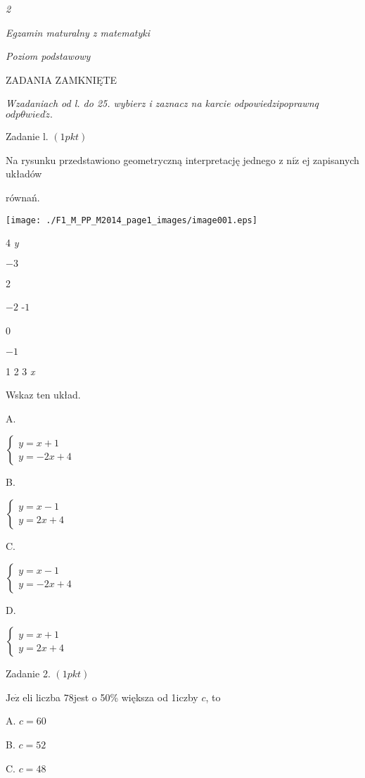 \documentclass[a4paper,12pt]{article}
\begin{document}
{\it 2}

{\it Egzamin maturalny z matematyki}

{\it Poziom podstawowy}

ZADANIA ZAMKNIĘTE

{\it Wzadaniach od l. do 25. wybierz i zaznacz na karcie odpowiedzipoprawnq} $odp\theta wied\acute{z}.$

Zadanie l. $(1pkt)$

Na rysunku przedstawiono geometryczną interpretację jednego z $\mathrm{n}\mathrm{i}\dot{\mathrm{z}}$ ej zapisanych układów

równań.
\begin{center}
\texttt{[image: ./F1\_M\_PP\_M2014\_page1\_images/image001.eps]}
\end{center}
4  {\it y}

$-3$

2

$-2$ -$1$

0

$-1$

1 2 3  {\it x}

Wskaz ten układ.

A.

$\left\{\begin{array}{l}
y=x+1\\
y=-2x+4
\end{array}\right.$

B.

$\left\{\begin{array}{l}
y=x-1\\
y=2x+4
\end{array}\right.$

C.

$\left\{\begin{array}{l}
y=x-1\\
y=-2x+4
\end{array}\right.$

D.

$\left\{\begin{array}{l}
y=x+1\\
y=2x+4
\end{array}\right.$

Zadanie 2. $(1pkt)$

$\mathrm{J}\mathrm{e}\dot{\mathrm{z}}$ eli liczba $78$jest o 50\% większa od 1iczby $c$, to

A. $c=60$

B. $c=52$

C. $c=48$
\end{document}

